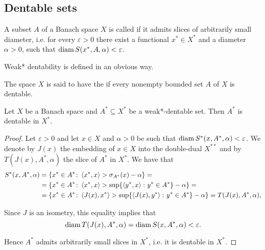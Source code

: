 \subsection{Dentable sets}\label{subsec:dentable_sets}

\begin{definition}\label{def:dentability}
  A subset \( A \) of a Banach space \( X \) is called  if it admits slices of arbitrarily small diameter, i.e. for every \( \varepsilon > 0 \) there exist a functional \( x^* \in X^* \) and a diameter \( \alpha > 0 \), such that \( \operatorname{diam} S(x^*, A, \alpha) < \varepsilon \).

  Weak* dentability is defined in an obvious way.
\end{definition}

\begin{definition}\label{def:radon-nikodym-property}
  The space \( X \) is said to have the  if every nonempty bounded set \( A \) of \( X \) is dentable.
\end{definition}

\begin{proposition}\label{thm:weak_dentable_sets_are_dentable}
  Let \( X \) be a Banach space and \( A^* \subseteq X^* \) be a weak*-dentable set. Then \( A^* \) is dentable in \( X^* \).
\end{proposition}
\begin{proof}
  Let \( \varepsilon > 0 \) and let \( x \in X \) and \( \alpha > 0 \) be such that \( \operatorname{diam} S^*(x, A^*, \alpha) < \varepsilon \).
  We denote by \( J(x) \) the embedding of \( x \in X \) into the double-dual \( X^{**} \) and by \( T(J(x), A^*, \alpha) \) the slice of \( A^* \) in \( X^* \). We have that
  \begin{align*}
    S^*(x, A^*, \alpha)
     & =
    \{ x^* \in A^* \colon \left\langle x^*, x \right\rangle > \sigma_{A^*}(x) - \alpha \}
    =    \\ &=
    \{ x^* \in A^* \colon \left\langle x^*, x \right\rangle > \sup \{ \left\langle y^*, x \right\rangle \colon y^* \in A^* \} - \alpha \}
    =    \\ &=
    \{ x^* \in A^* \colon \left\langle J(x), x^* \right\rangle > \sup \{ \left\langle J(x), y^* \right\rangle \colon y^* \in A^* \} - \alpha \}
    =
    T(J(x), A^*, \alpha),
  \end{align*}

  Since \( J \) is an isometry, this equality implies that
  \begin{equation*}
    \operatorname{diam} T(J(x), A^*, \alpha) = \operatorname{diam} S(x, A^*, \alpha) < \varepsilon.
  \end{equation*}

  Hence \( A^* \) admits arbitrarily small slices in \( X^* \), i.e. it is dentable in \( X^* \).
\end{proof}
